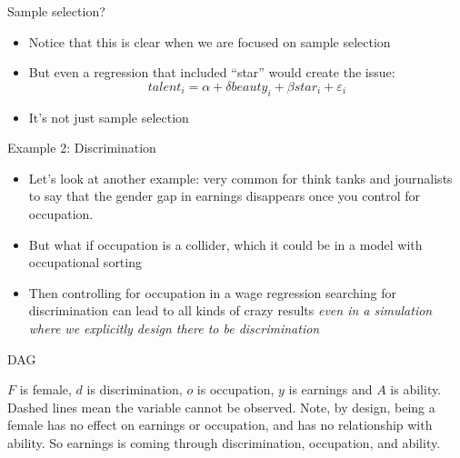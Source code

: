 \documentclass{beamer}
\begin{document}
\begin{frame}{Sample selection?}

\begin{itemize}
\item Notice that this is clear when we are focused on sample selection
\item But even a regression that included ``star'' would create the issue:$$talent_i = \alpha + \delta beauty_i + \beta star_i + \varepsilon_i$$
\item It's not just sample selection 
\end{itemize}

\end{frame}


\begin{frame}{Example 2: Discrimination}

  \begin{itemize}
    \item Let's look at another example: very common for think tanks and journalists to say that the gender gap in earnings disappears once you control for occupation.
    \item But what if occupation is a collider, which it could be in a model with occupational sorting
    \item Then controlling for occupation in a wage regression searching for discrimination can lead to all kinds of crazy results \emph{even in a simulation where we explicitly design there to be discrimination}
  \end{itemize}

\end{frame}

\begin{frame}{DAG}

  \begin{center}
  \end{center}

  $F$ is female, $d$ is discrimination, $o$ is occupation, $y$ is earnings and $A$ is ability. Dashed lines mean the variable cannot be observed. Note, by design, being a female has no effect on earnings or occupation, and has no relationship with ability. So earnings is coming through discrimination, occupation, and ability.

\end{frame}
\end{document}
